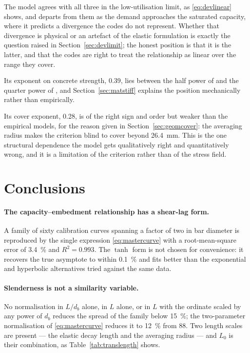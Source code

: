 The model agrees with all three in the low-utilisation limit, as
\eqref{eq:devlinear} shows, and departs from them as the demand approaches
the saturated capacity, where it predicts a divergence the codes do not
represent. Whether that divergence is physical or an artefact of the elastic
formulation is exactly the question raised in Section~\ref{sec:devlimit};
the honest position is that it is the latter, and that the codes are right
to treat the relationship as linear over the range they cover.

Its exponent on concrete strength, \num{0.39}, lies between the half power
of \textcite{as3600ConcreteStructures2018} and the quarter power of
\textcite{408R03BondDevelopment}, and Section~\ref{sec:matstiff} explains
the position mechanically rather than empirically.

Its cover exponent, \num{0.28}, is of the right sign and order but weaker
than the empirical models, for the reason given in
Section~\ref{sec:geomcover}: the averaging radius makes the criterion blind
to cover beyond \SI{26.4}{\milli\metre}. This is the one structural
dependence the model gets qualitatively right and quantitatively wrong, and
it is a limitation of the criterion rather than of the stress field.


\section{Conclusions}
\label{sec:devconc}

\paragraph{The capacity--embedment relationship has a shear-lag form.}
A family of sixty calibration curves spanning a factor of two in bar
diameter is reproduced by the single expression \eqref{eq:mastercurve} with
a root-mean-square error of \SI{3.4}{\percent} and $R^2 = 0.993$. The
$\tanh$ form is not chosen for convenience: it recovers the true asymptote
to within \SI{0.1}{\percent} and fits better than the exponential and
hyperbolic alternatives tried against the same data.

\paragraph{Slenderness is not a similarity variable.}
No normalisation in $L/d_b$ alone, in $L$ alone, or in $L$ with the ordinate
scaled by any power of $d_b$ reduces the spread of the family below
\SI{15}{\percent}; the two-parameter normalisation of
\eqref{eq:mastercurve} reduces it to \SI{12}{\percent} from \SI{88}{}. Two
length scales are present --- the elastic decay length and the averaging
radius --- and $L_0$ is their combination, as
Table~\ref{tab:translength} shows.

